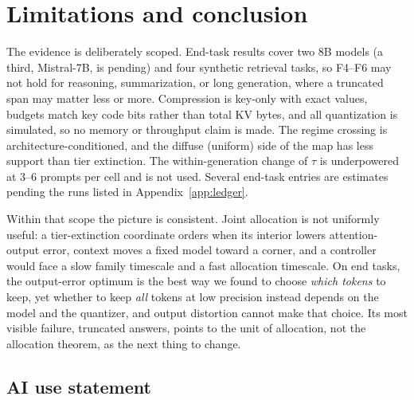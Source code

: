\documentclass{article}
\theoremstyle{definition}
\begin{document}
\section{Limitations and conclusion}
\label{sec:conclusion}

The evidence is deliberately scoped.  End-task results cover two 8B models (a third, Mistral-7B, is pending) and four synthetic retrieval tasks, so F4--F6 may not hold for reasoning, summarization, or long generation, where a truncated span may matter less or more.  Compression is key-only with exact values, budgets match key code bits rather than total KV bytes, and all quantization is simulated, so no memory or throughput claim is made.  The regime crossing is architecture-conditioned, and the diffuse (uniform) side of the map has less support than tier extinction.  The within-generation change of $\tau$ is underpowered at 3--6 prompts per cell and is not used.  Several end-task entries are estimates pending the runs listed in Appendix~\ref{app:ledger}.

Within that scope the picture is consistent.  Joint allocation is not uniformly useful: a tier-extinction coordinate orders when its interior lowers attention-output error, context moves a fixed model toward a corner, and a controller would face a slow family timescale and a fast allocation timescale.  On end tasks, the output-error optimum is the best way we found to choose \emph{which tokens} to keep, yet whether to keep \emph{all} tokens at low precision instead depends on the model and the quantizer, and output distortion cannot make that choice.  Its most visible failure, truncated answers, points to the unit of allocation, not the allocation theorem, as the next thing to change.

\label{main:end}

\subsection*{AI use statement}
\end{document}
